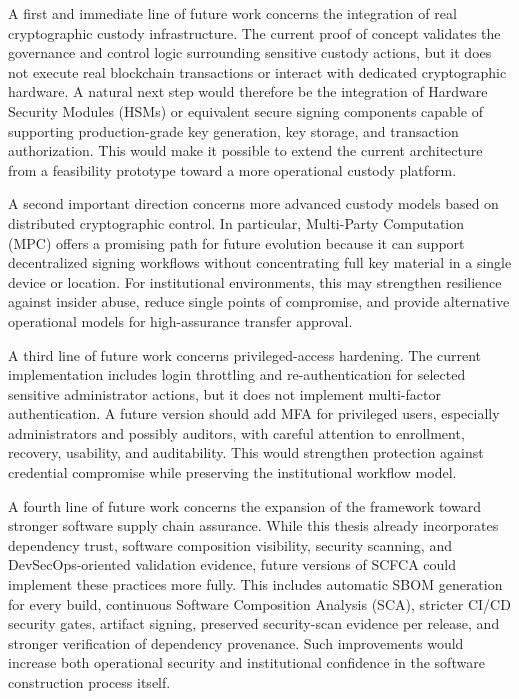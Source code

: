 \documentclass[12pt,a4paper]{report}
\begin{document}
A first and immediate line of future work concerns the integration of real cryptographic custody infrastructure. The current proof of concept validates the governance and control logic surrounding sensitive custody actions, but it does not execute real blockchain transactions or interact with dedicated cryptographic hardware. A natural next step would therefore be the integration of Hardware Security Modules (HSMs) or equivalent secure signing components capable of supporting production-grade key generation, key storage, and transaction authorization. This would make it possible to extend the current architecture from a feasibility prototype toward a more operational custody platform.

A second important direction concerns more advanced custody models based on distributed cryptographic control. In particular, Multi-Party Computation (MPC) offers a promising path for future evolution because it can support decentralized signing workflows without concentrating full key material in a single device or location. For institutional environments, this may strengthen resilience against insider abuse, reduce single points of compromise, and provide alternative operational models for high-assurance transfer approval.

A third line of future work concerns privileged-access hardening. The current implementation includes login throttling and re-authentication for selected sensitive administrator actions, but it does not implement multi-factor authentication. A future version should add MFA for privileged users, especially administrators and possibly auditors, with careful attention to enrollment, recovery, usability, and auditability. This would strengthen protection against credential compromise while preserving the institutional workflow model.

A fourth line of future work concerns the expansion of the framework toward stronger software supply chain assurance. While this thesis already incorporates dependency trust, software composition visibility, security scanning, and DevSecOps-oriented validation evidence, future versions of SCFCA could implement these practices more fully. This includes automatic SBOM generation for every build, continuous Software Composition Analysis (SCA), stricter CI/CD security gates, artifact signing, preserved security-scan evidence per release, and stronger verification of dependency provenance. Such improvements would increase both operational security and institutional confidence in the software construction process itself.
\end{document}
